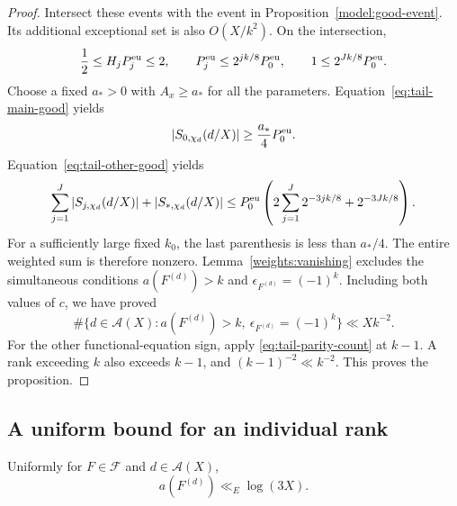 \begin{proof}
Intersect these events with the event in
Proposition~\ref{model:good-event}. Its additional exceptional set is
also \(O(X/k^2)\). On the intersection,
\[
 \frac12\le H_jP_j^{\rm eu}\le2,\qquad
 P_j^{\rm eu}\le 2^{jk/8}P_0^{\rm eu},\qquad
 1\le 2^{Jk/8}P_0^{\rm eu}.
\]
Choose a fixed \(a_*>0\) with \(A_x\ge a_*\) for all the parameters.
Equation~\eqref{eq:tail-main-good} yields
\[
 |S_{0,\chi_d}(d/X)|\ge\frac{a_*}{4}P_0^{\rm eu}.
\]
Equation~\eqref{eq:tail-other-good} yields
\[
 \sum_{j=1}^J|S_{j,\chi_d}(d/X)|+|S_{*,\chi_d}(d/X)|
 \le P_0^{\rm eu}
     \left(2\sum_{j=1}^J2^{-3jk/8}+2^{-3Jk/8}\right).
\]
For a sufficiently large fixed \(k_0\), the last parenthesis is less
than \(a_*/4\). The entire weighted sum is therefore nonzero.
Lemma~\ref{weights:vanishing} excludes the simultaneous conditions
\(a(F^{(d)})>k\) and \(\epsilon_{F^{(d)}}=(-1)^k\).
Including both values of \(c\), we have proved
\begin{equation}\label{eq:tail-parity-count}
 \#\{d\in\mathcal A(X):
       a(F^{(d)})>k,\ \epsilon_{F^{(d)}}=(-1)^k\}
       \ll Xk^{-2}.
\end{equation}
For the other functional-equation sign, apply
\eqref{eq:tail-parity-count} at \(k-1\). A rank exceeding \(k\) also exceeds
\(k-1\), and \((k-1)^{-2}\ll k^{-2}\).
This proves the proposition.
\end{proof}

\subsection{A uniform bound for an individual rank}

\begin{lemma}\label{tail:jensen}
Uniformly for \(F\in\mathcal F\) and \(d\in\mathcal A(X)\),
\[
 a(F^{(d)})\ll_E\log(3X).
\]
\end{lemma}

